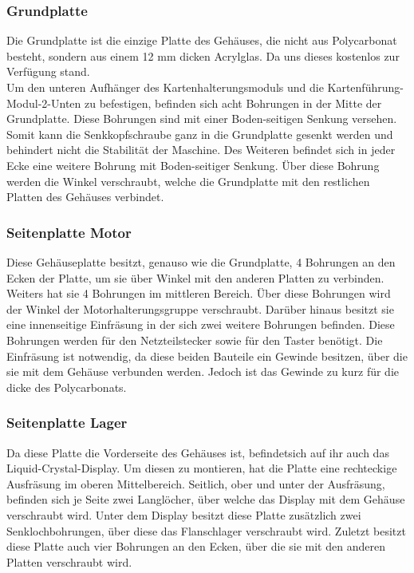 \subsubsection{Grundplatte}
Die Grundplatte ist die einzige Platte des Gehäuses, die nicht aus Polycarbonat besteht, sondern aus einem 12 mm dicken
Acrylglas.
Da uns dieses kostenlos zur Verfügung stand.\\
Um den unteren Aufhänger des Kartenhalterungsmoduls und die Kartenführung-Modul-2-Unten zu befestigen, befinden sich acht
Bohrungen in der Mitte der Grundplatte.
Diese Bohrungen sind mit einer Boden-seitigen Senkung versehen.
Somit kann die Senkkopfschraube ganz in die Grundplatte gesenkt werden und behindert nicht die Stabilität der Maschine.
Des Weiteren befindet sich in jeder Ecke eine weitere Bohrung mit Boden-seitiger Senkung.
Über diese Bohrung werden die Winkel verschraubt, welche die Grundplatte mit den restlichen Platten des Gehäuses verbindet.

\subsubsection{Seitenplatte Motor}
Diese Gehäuseplatte besitzt, genauso wie die Grundplatte, 4 Bohrungen an den Ecken der Platte, um sie über Winkel
mit den anderen Platten zu verbinden.
Weiters hat sie 4 Bohrungen im mittleren Bereich.
Über diese Bohrungen wird der Winkel der Motorhalterungsgruppe verschraubt.
Darüber hinaus besitzt sie eine innenseitige Einfräsung in der sich
zwei weitere Bohrungen befinden.
Diese Bohrungen werden für den Netzteilstecker sowie für den Taster benötigt.
Die Einfräsung ist notwendig, da diese beiden Bauteile ein Gewinde besitzen, über die sie mit dem Gehäuse verbunden werden.
Jedoch ist das Gewinde zu kurz für die dicke des Polycarbonats.

\subsubsection{Seitenplatte Lager}
Da diese Platte die Vorderseite des Gehäuses ist, befindetsich auf ihr auch das Liquid-Crystal-Display.
Um diesen zu montieren, hat die Platte eine rechteckige Ausfräsung im oberen Mittelbereich.
Seitlich, ober und unter der Ausfräsung, befinden sich je Seite zwei Langlöcher, über welche das Display mit dem Gehäuse verschraubt wird.
Unter dem Display besitzt diese Platte zusätzlich zwei Senklochbohrungen, über diese das Flanschlager verschraubt wird.
Zuletzt besitzt diese Platte auch vier Bohrungen an den Ecken, über die sie mit den anderen Platten verschraubt wird.

